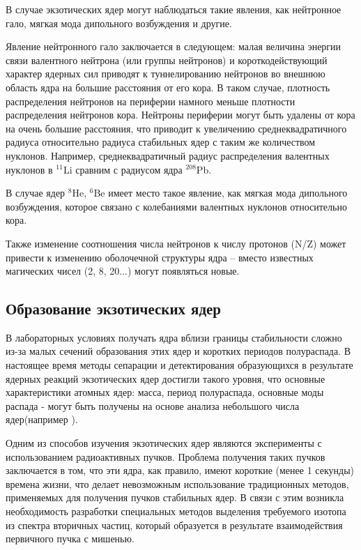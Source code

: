 В случае экзотических ядер могут наблюдаться такие явления, как нейтронное гало, мягкая мода дипольного возбуждения и другие. 

Явление нейтронного гало заключается в следующем: малая величина энергии связи  валентного нейтрона (или группы нейтронов) и короткодействующий характер ядерных сил  приводят к туннелированию нейтронов во внешнюю область ядра на большие расстояния от его кора. В таком случае, плотность распределения нейтронов на периферии намного меньше плотности распределения нейтронов кора. Нейтроны периферии могут быть удалены от кора на очень большие расстояния, что приводит к увеличению среднеквадратичного радиуса относительно радиуса стабильных ядер с таким же количеством нуклонов. Например, среднеквадратичный радиус распределения валентных нуклонов в $^{11}$Li сравним с радиусом ядра $^{208}$Pb.

В случае ядер $^8$He, $^6$Be имеет место такое явление, как мягкая мода дипольного возбуждения, которое связано с колебаниями валентных нуклонов относительно кора.

Также изменение соотношения числа нейтронов к числу протонов (N/Z) может привести к изменению оболочечной структуры ядра – вместо известных магических чисел (2, 8, 20...) могут появляться новые.

\subsection{Образование экзотических ядер}


В лабораторных условиях получать ядра вблизи границы стабильности сложно из-за малых сечений образования этих ядер и коротких периодов полураспада. В настоящее время методы сепарации и детектирования образующихся в результате ядерных реакций экзотических ядер достигли такого уровня, что основные характеристики атомных ядер: масса, период полураспада, основные моды распада - могут быть получены на основе анализа небольшого числа ядер(например \cite{flnr}).

Одним из способов изучения экзотических ядер являются эксперименты с использованием радиоактивных пучков. Проблема получения таких пучков заключается в том, что эти ядра, как правило,  имеют короткие (менее 1 секунды) времена жизни, что делает невозможным использование традиционных методов, применяемых для получения пучков стабильных ядер. В связи с этим возникла необходимость разработки специальных методов выделения требуемого изотопа из спектра вторичных частиц, который образуется в результате взаимодействия первичного пучка с мишенью.

